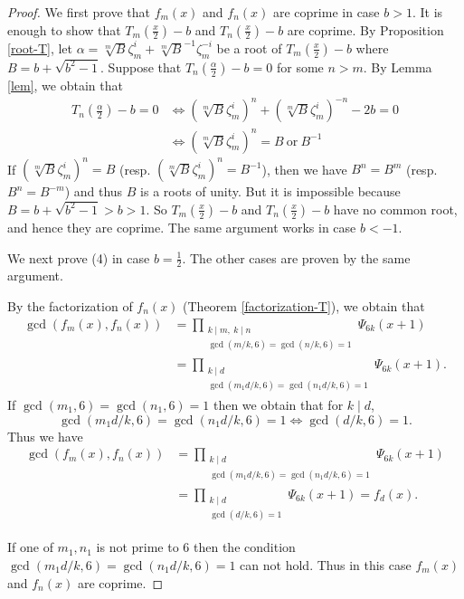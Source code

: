 \documentclass[a4paper, 11pt]{amsart}
\numberwithin{equation}{section}
\theoremstyle{definition}
\begin{document}
\begin{proof}
We first prove that $f_m(x)$ and $f_n(x)$ are coprime in case $b>1$.
It is enough to show that $T_m(\frac x2)-b$ and $T_n(\frac x2)-b$ are coprime.
By Proposition \ref{root-T}, let $\alpha=\sqrt[m]{B}\zeta_m^i + \sqrt[m]{B}^{-1}\zeta_m^{-i}$ be a root of $T_m(\frac x2)-b$ where $B=b + \sqrt{b^2 -1 }$.
Suppose that $T_n(\frac {\alpha}2)-b=0$ for some $n>m$.
By Lemma \ref{lem},  we obtain that
\begin{align*}
T_n\left(\frac {\alpha}2\right)-b=0
&\iff
(\sqrt[m]{B}\zeta_m^i)^n + (\sqrt[m]{B}\zeta_m^{i})^{-n}-2b=0\\
&\iff
(\sqrt[m]{B}\zeta_m^i)^n=B \ \text{or}\ B^{-1}
\end{align*}
If $(\sqrt[m]{B}\zeta_m^i)^n=B$ (resp. $(\sqrt[m]{B}\zeta_m^i)^n=B^{-1}$), then we have
$B^n=B^m
$
(resp. $B^n=B^{-m}$)
and thus $B$ is a roots of unity.
But it is impossible because $B=b+\sqrt{b^2-1}>b>1$.
So $T_m(\frac x2)-b$ and $T_n(\frac x2)-b$ have no common root, and hence they are coprime.
The same argument works in case $b<-1$.


We next prove (4) in case $b=\frac12$. The other cases are proven by the same argument.

By the factorization of $f_n(x)$ (Theorem \ref{factorization-T}), we obtain that
\begin{align*}
\gcd(f_m(x), f_n(x))
&=\prod_{\substack{k \mid m,\ k\mid n \\ \gcd(m/k, 6)=\gcd(n/k, 6) = 1}}\Psi_{6k}(x+1)\\
&=\prod_{\substack{k \mid d \\ \gcd(m_1d/k , 6)=\gcd(n_1d/k, 6) = 1}}\Psi_{6k}(x+1).
\end{align*}
If $\gcd(m_1,6)=\gcd(n_1,6)=1$ then we obtain that for $k\mid d$,
\[
\gcd\left(m_1 d/k, 6\right)=\gcd\left(n_1d/k, 6\right) = 1 
\iff
\gcd\left(d/k, 6\right)=1.
\]
Thus we have
\begin{align*}
\gcd(f_m(x), f_n(x))
&=\prod_{\substack{k \mid d \\ \gcd(m_1d/k, 6)=\gcd(n_1d/k, 6) = 1}}\Psi_{6k}(x+1)\\
&=\prod_{\substack{k \mid d \\ \gcd(d/k, 6)= 1}}\Psi_{6k}(x+1)
=f_d(x).
\end{align*}

If one of $m_1, n_1$ is not prime to $6$ then the condition $\gcd(m_1d/k, 6)=\gcd(n_1d/k, 6) = 1$ can not hold.
Thus in this case $f_m(x)$ and $f_n(x)$ are coprime.
\end{proof}
\end{document}
